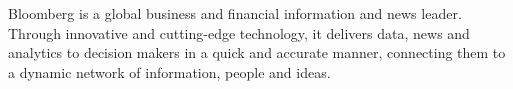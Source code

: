 \documentclass[12pt]{letter} %
\newcommand{\company}{Bloomberg}
\begin{document}
\begin{letter}
\company{}
is a global business and financial information and news leader. Through innovative and cutting-edge technology, it delivers data, news and analytics to decision makers in a quick and accurate manner, connecting them to a dynamic network of information, people and ideas.

\end{letter}
\end{document}

